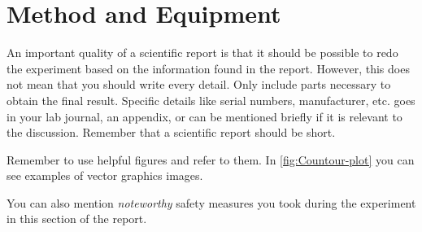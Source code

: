 \section{Method and Equipment}

An important quality of a scientific report is that it should be possible to redo the experiment based on the
information found in the report.
However, this does not mean that you should write every detail. Only include parts necessary to obtain the final result.
Specific details like serial numbers, manufacturer, etc. goes in your lab journal, an appendix, or can be mentioned briefly if it is relevant to the discussion. Remember that a scientific report should be short. \par
Remember to use helpful figures and refer to them. In \cref{fig:Countour-plot} you can see examples of vector graphics images. \par
You can also mention \textit{noteworthy} safety measures you took during the experiment in this section of the report.
